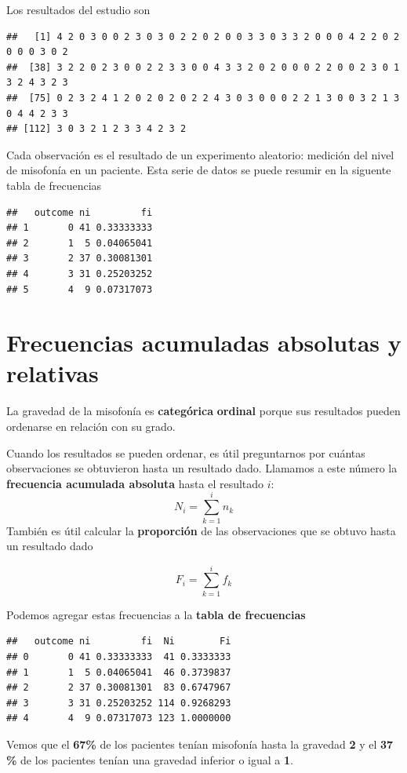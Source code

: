 \documentclass[
]{book}
\begin{document}
Los resultados del estudio son

\begin{verbatim}
##   [1] 4 2 0 3 0 0 2 3 0 3 0 2 2 0 2 0 0 3 3 0 3 3 2 0 0 0 4 2 2 0 2 0 0 0 3 0 2
##  [38] 3 2 2 0 2 3 0 0 2 2 3 3 0 0 4 3 3 2 0 2 0 0 0 2 2 0 0 2 3 0 1 3 2 4 3 2 3
##  [75] 0 2 3 2 4 1 2 0 2 0 2 0 2 2 4 3 0 3 0 0 0 2 2 1 3 0 0 3 2 1 3 0 4 4 2 3 3
## [112] 3 0 3 2 1 2 3 3 4 2 3 2
\end{verbatim}

Cada observación es el resultado de un experimento aleatorio: medición del nivel de misofonía en un paciente. Esta serie de datos se puede resumir en la siguente tabla de frecuencias

\begin{verbatim}
##   outcome ni         fi
## 1       0 41 0.33333333
## 2       1  5 0.04065041
## 3       2 37 0.30081301
## 4       3 31 0.25203252
## 5       4  9 0.07317073
\end{verbatim}

\hypertarget{frecuencias-acumuladas-absolutas-y-relativas}{%
\section{Frecuencias acumuladas absolutas y relativas}\label{frecuencias-acumuladas-absolutas-y-relativas}}

La gravedad de la misofonía es \textbf{categórica} \textbf{ordinal} porque sus resultados pueden ordenarse en relación con su grado.

Cuando los resultados se pueden ordenar, es útil preguntarnos por cuántas observaciones se obtuvieron hasta un resultado dado. Llamamos a este número la \textbf{frecuencia acumulada absoluta} hasta el resultado \(i\):
\[N_i=\sum_{k=1}^i n_k\]
También es útil calcular la \textbf{proporción} de las observaciones que se obtuvo hasta un resultado dado

\[F_i=\sum_{k=1}^i f_k\]

Podemos agregar estas frecuencias a la \textbf{tabla de frecuencias}

\begin{verbatim}
##   outcome ni         fi  Ni        Fi
## 0       0 41 0.33333333  41 0.3333333
## 1       1  5 0.04065041  46 0.3739837
## 2       2 37 0.30081301  83 0.6747967
## 3       3 31 0.25203252 114 0.9268293
## 4       4  9 0.07317073 123 1.0000000
\end{verbatim}

Vemos que el \textbf{67\%} de los pacientes tenían misofonía hasta la gravedad \textbf{2} y el \textbf{37 \%} de los pacientes tenían una gravedad inferior o igual a \textbf{1}.
\end{document}
